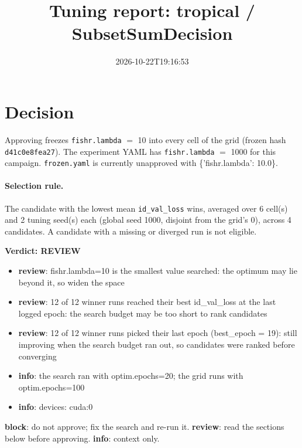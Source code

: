 \documentclass[10pt]{article}
\title{Tuning report: tropical / SubsetSumDecision}
\date{2026-10-22T19:16:53}
\begin{document}
\maketitle

\section{Decision}
Approving freezes
\texttt{fishr.lambda} $=$ 10 into every cell of the grid (frozen hash \texttt{d41c0e8fea27}).
The experiment YAML has
\texttt{fishr.lambda} $=$ 1000 for this campaign.
\texttt{frozen.yaml} is currently unapproved with \{'fishr.lambda': 10.0\}.

\paragraph{Selection rule.} The candidate with the lowest mean \texttt{id\_val\_loss} wins, averaged over 6 cell(s) and 2 tuning seed(s) each (global seed 1000, disjoint from the grid's 0), across 4 candidates. A candidate with a missing or diverged run is not eligible.

\begin{framed}
\noindent\textbf{Verdict: \textcolor{orange!85!black}{REVIEW}}
\begin{itemize}\setlength\itemsep{0pt}
\item \textbf{review}: fishr.lambda=10 is the smallest value searched: the optimum may lie beyond it, so widen the space
\item \textbf{review}: 12 of 12 winner runs reached their best id\_val\_loss at the last logged epoch: the search budget may be too short to rank candidates
\item \textbf{review}: 12 of 12 winner runs picked their last epoch (best\_epoch = 19): still improving when the search budget ran out, so candidates were ranked before converging
\item \textbf{info}: the search ran with optim.epochs=20; the grid runs with optim.epochs=100
\item \textbf{info}: devices: cuda:0
\end{itemize}
\end{framed}
\noindent\textbf{block}: do not approve; fix the search and re-run it. \textbf{review}: read the sections below before approving. \textbf{info}: context only.
\end{document}
